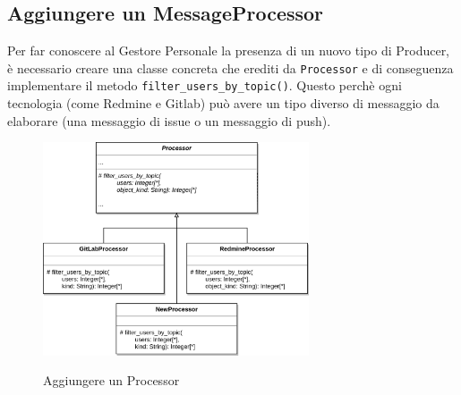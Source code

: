 \subsection{Aggiungere un MessageProcessor} \label{EstProcessor}

Per far conoscere al Gestore Personale la presenza di un nuovo tipo di Producer, è necessario creare una classe concreta che erediti da \texttt{Processor} e di conseguenza implementare il metodo \texttt{filter\_users\_by\_topic()}.
Questo perchè ogni tecnologia (come Redmine e Gitlab) può avere un tipo diverso di messaggio da elaborare (una messaggio di issue o un messaggio di push).


\begin{figure}[H]
    \centering
    \includegraphics[width=0.7\textwidth]{img/EstensioneGP-Processor.png}\\
    \caption{Aggiungere un Processor}
\end{figure}
